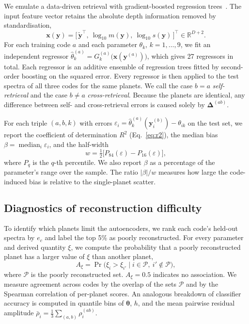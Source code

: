 We emulate a data-driven retrieval with gradient-boosted regression trees~\cite{TODO_chen_xgboost}.
The input feature vector retains the absolute depth information removed by standardisation,
\begin{equation}
  \mathbf{x}(\mathbf{y}) = \bigl[\,\tilde{\mathbf{y}}^{\top},\ \log_{10}m(\mathbf{y}),\ \log_{10}s(\mathbf{y})\,\bigr]^{\top}\in\mathbb{R}^{D+2}.
  \label{eq:xgbfeat}
\end{equation}
For each training code $a$ and each parameter $\theta_k$, $k=1,\dots,9$, we fit an independent regressor $\hat{\theta}^{(a)}_k=G^{(a)}_k\bigl(\mathbf{x}(\mathbf{y}^{(a)})\bigr)$, which gives 27 regressors in total.
Each regressor is an additive ensemble of regression trees fitted by second-order boosting on the squared error.
Every regressor is then applied to the test spectra of all three codes for the same planets.
We call the case $b=a$ \emph{self-retrieval} and the case $b\neq a$ \emph{cross-retrieval}.
Because the planets are identical, any difference between self- and cross-retrieval errors is caused solely by $\bm{\Delta}^{(ab)}$.

For each triple $(a,b,k)$ with errors $\varepsilon_i=\hat{\theta}^{(a)}_{k}(\mathbf{y}_i^{(b)})-\theta_{ik}$ on the test set, we report the coefficient of determination $R^{2}$ (Eq.~\ref{eq:r2}), the median bias $\beta=\operatorname{median}_i\varepsilon_i$, and the half-width
\begin{equation}
  w = \tfrac{1}{2}\bigl[P_{84}(\varepsilon)-P_{16}(\varepsilon)\bigr],
  \label{eq:halfwidth}
\end{equation}
where $P_q$ is the $q$-th percentile.
We also report $\beta$ as a percentage of the parameter's range over the sample.
The ratio $|\beta|/w$ measures how large the code-induced bias is relative to the single-planet scatter.

\subsection{Diagnostics of reconstruction difficulty}
\label{sec:diag}

To identify which planets limit the autoencoders, we rank each code's held-out spectra by $e_c$ and label the top 5\% as poorly reconstructed.
For every parameter and derived quantity $\xi$, we compute the probability that a poorly reconstructed planet has a larger value of $\xi$ than another planet,
\begin{equation}
  A_{\xi} = \Pr\bigl(\xi_i > \xi_{i'} \mid i\in\mathcal{P},\ i'\notin\mathcal{P}\bigr),
  \label{eq:auc_param}
\end{equation}
where $\mathcal{P}$ is the poorly reconstructed set.
$A_\xi=0.5$ indicates no association.
We measure agreement across codes by the overlap of the sets $\mathcal{P}$ and by the Spearman correlation of per-planet scores.
An analogous breakdown of classifier accuracy is computed in quantile bins of $\bm{\theta}$, $h$, and the mean pairwise residual amplitude $\bar{\rho}_i=\tfrac{1}{3}\sum_{(a,b)}\rho_i^{(ab)}$.

